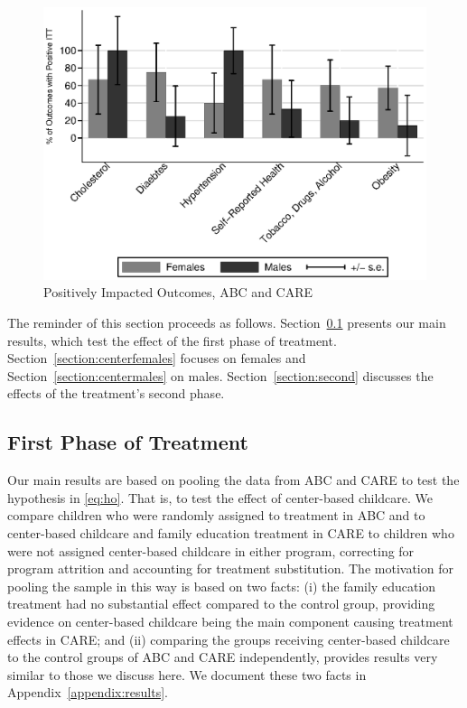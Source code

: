 \begin{figure}[H]
		\caption{Positively Impacted Outcomes, ABC and CARE} \label{fig:ppositivecategory2}
		\includegraphics[width=.9\columnwidth]{output/itt_noctrl_cats2.eps}
\end{figure}

\noindent The reminder of this section proceeds as follows. Section~\ref{section:center} presents our main results, which test the effect of the first phase of treatment. Section~\ref{section:centerfemales} focuses on females and Section~\ref{section:centermales} on males. Section~\ref{section:second} discusses the effects of the treatment's second phase.\\

\subsection{First Phase of Treatment} \label{section:center}

\noindent Our main results are based on pooling the data from ABC and CARE to test the hypothesis in \eqref{eq:ho}. That is, to test the effect of center-based childcare. We compare children who were randomly assigned to treatment in ABC and to center-based childcare and family education treatment in CARE to children who were not assigned center-based childcare in either program, correcting for program attrition and accounting for treatment substitution. The motivation for pooling the sample in this way is based on two facts: (i) the family education treatment had no substantial effect compared to the control group, providing evidence on center-based childcare being the main component causing treatment effects in CARE; and (ii) comparing the groups receiving center-based childcare to the control groups of ABC and CARE independently, provides results very similar to those we discuss here. We document these two facts in Appendix~\ref{appendix:results}.\\

